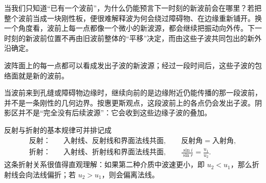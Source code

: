 当我们只知道“已有一个波前”，为什么仍能预言下一时刻的新波前会在哪里？若把整个波前当成一块刚性板，便很难解释波为何会绕过障碍物、在边缘重新铺开。换一个角度看，波前上每一点都像一个微小的新波源，都会继续把振动向外传。下一时刻的新波前位置不再由旧波前整体的“平移”决定，而由这些子波共同包出的新外沿确定。

\begin{theorem}[惠更斯原理]
波阵面上的每一点都可以看成发出子波的新波源；经过一段时间后，这些子波的包络面就是新的波前。
\end{theorem}

当波前来到孔缝或障碍物边缘时，继续向前的是边缘附近仍能传播的那一段波前，并不是一条刚性的几何边界。按惠更斯观点，这段波前上的各点仍会发出子波。阴影区并不是“完全没有后续波源”：它会收到这些边缘子波的叠加。

\begin{theorem}[波的反射和折射]
反射与折射的基本规律可并排记成
\[
\begin{aligned}
\text{反射：}\quad &\text{入射线、反射线和界面法线共面},\qquad \text{反射角}=\text{入射角},\\
\text{折射：}\quad &\text{入射线、折射线和界面法线共面},\qquad \frac{\sin i}{\sin r}=\frac{u_1}{u_2}.
\end{aligned}
\]
这条折射关系很值得直观理解：如果第二种介质中波速更小，即 \(u_2<u_1\)，那么折射线会向法线偏折；若 \(u_2>u_1\)，则会偏离法线。
\end{theorem}
